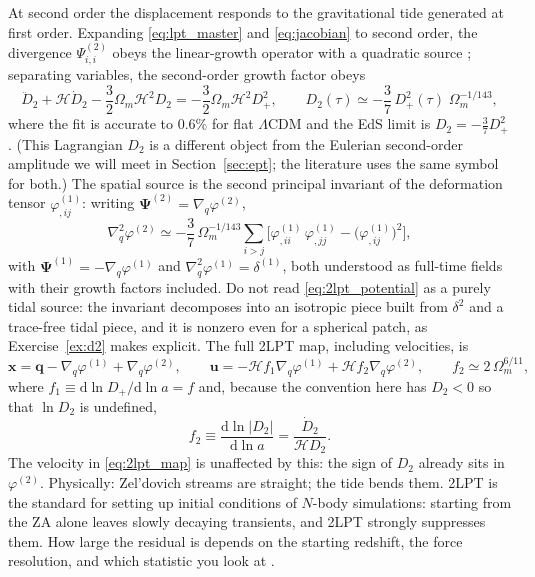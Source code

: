 \documentclass[a4paper,11pt]{article}
\newcommand{\vx}{\bm{x}}
\newcommand{\vq}{\bm{q}}
\newcommand{\vu}{\bm{u}}
\newcommand{\vPsi}{\bm{\Psi}}
\def\cH{\mathcal{H}}
\newcommand{\dd}{\mathrm{d}}
\def\lcdm{$\Lambda$CDM}
\def\Om{\Omega_m}
\numberwithin{equation}{section}
\begin{document}
At second order the displacement responds to the gravitational tide generated at first order. Expanding \eqref{eq:lpt_master} and \eqref{eq:jacobian} to second order, the divergence $\Psi^{(2)}_{i,i}$ obeys the linear-growth operator with a quadratic source \cite[Eqs.~(E.30)--(E.31)]{Jeong2010}; separating variables, the second-order growth factor obeys
\begin{equation}
\ddot D_2 + \cH\dot D_2 - \frac{3}{2}\Om\cH^2 D_2
= -\frac{3}{2}\Om\cH^2 D_+^2 ,
\qquad
D_2(\tau) \simeq -\frac{3}{7}\,D_+^2(\tau)\;\Om^{-1/143},
\label{eq:D2}
\end{equation}
where the fit is accurate to $0.6\%$ for flat \lcdm{} and the EdS limit is $D_2 = -\tfrac37 D_+^2$. (This Lagrangian $D_2$ is a different object from the Eulerian second-order amplitude we will meet in Section~\ref{sec:ept}; the literature uses the same symbol for both.) The spatial source is the second principal invariant of the deformation tensor $\varphi^{(1)}_{,ij}$: writing $\vPsi^{(2)} = \nabla_q\varphi^{(2)}$,
\begin{equation}
\nabla_q^2\varphi^{(2)}
\simeq -\frac{3}{7}\,\Om^{-1/143}
\sum_{i>j}\Big[\varphi^{(1)}_{,ii}\,\varphi^{(1)}_{,jj} - \big(\varphi^{(1)}_{,ij}\big)^2\Big],
\label{eq:2lpt_potential}
\end{equation}
with $\vPsi^{(1)} = -\nabla_q\varphi^{(1)}$ and $\nabla^2_q\varphi^{(1)} = \delta^{(1)}$, both understood as full-time fields with their growth factors included. Do not read \eqref{eq:2lpt_potential} as a purely tidal source: the invariant decomposes into an isotropic piece built from $\delta^2$ and a trace-free tidal piece, and it is nonzero even for a spherical patch, as Exercise~\ref{ex:d2} makes explicit. The full 2LPT map, including velocities, is
\begin{equation}
\vx = \vq - \nabla_q\varphi^{(1)} + \nabla_q\varphi^{(2)},
\qquad
\vu = -\cH f_1 \nabla_q\varphi^{(1)} + \cH f_2\nabla_q\varphi^{(2)},
\qquad
f_2 \simeq 2\,\Om^{6/11} ,
\label{eq:2lpt_map}
\end{equation}
where $f_1 \equiv \dd\ln D_+/\dd\ln a = f$ and, because the convention here has $D_2<0$ so that $\ln D_2$ is undefined,
\begin{equation}
f_2 \equiv \frac{\dd\ln|D_2|}{\dd\ln a} = \frac{\dot D_2}{\cH D_2} .
\label{eq:f2_def}
\end{equation}
The velocity in \eqref{eq:2lpt_map} is unaffected by this: the sign of $D_2$ already sits in $\varphi^{(2)}$. Physically: Zel'dovich streams are straight; the tide bends them. 2LPT is the standard for setting up initial conditions of $N$-body simulations: starting from the ZA alone leaves slowly decaying transients, and 2LPT strongly suppresses them. How large the residual is depends on the starting redshift, the force resolution, and which statistic you look at \cite[App.~E.5]{Jeong2010}.
\end{document}
